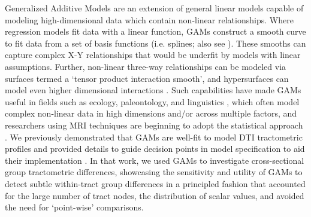 \documentclass[12pt]{article}
\begin{document}
Generalized Additive Models \parencite[GAMs;][]{wood2017GeneralizedAdditiveModels,pedersen2019HierarchicalGeneralizedAdditive,stasinopoulos2008GeneralizedAdditiveModels} are an extension of general linear models capable of modeling high-dimensional data which contain non-linear relationships. Where regression models fit data with a linear function, GAMs construct a smooth curve to fit data from a set of basis functions (i.e. splines; also see \textcite{verbyla1999AnalysisDesignedExperiments}). These smooths can capture complex X-Y relationships that would be underfit by models with linear assumptions. Further, non-linear three-way relationships can be modeled via surfaces termed a `tensor product interaction smooth', and hypersurfaces can model even higher dimensional interactions \parencite{baayen2020IntroductionGeneralizedAdditive}. Such capabilities have made GAMs useful in fields such as ecology, paleontology, and linguistics \parencite[e.g.][]{simpson2018ModellingPalaeoecologicalTime,pedersen2019HierarchicalGeneralizedAdditive,schmidt2011SpatiallyExplicitHeight,wieling2011QuantitativeSocialDialectology,simpson2018ModellingPalaeoecologicalTime,wieling2018AnalyzingDynamicPhonetic,murase2009ApplicationGeneralizedAdditive,vanrij2019AnalyzingTimeCourse}, which often model complex non-linear data in high dimensions and/or across multiple factors, and researchers using MRI techniques are beginning to adopt the statistical approach \parencite[e.g.][]{lee2025AtypicalMaturationFunctional,xu2025AgeBSASexspecific,wierenga2018UnravelingAgePuberty,mundo2022GeneralizedAdditiveModels,roy2025DevelopmentArcuateFasciculus,sorensen2021MetaanalysisGeneralizedAdditive,caffarra2024DevelopmentAlphaRhythm}. We previously demonstrated that GAMs are well-fit to model DTI tractometric profiles and provided details to guide decision points in model specification to aid their implementation \parencite{muncy2022GeneralAdditiveModels}. In that work, we used GAMs to investigate cross-sectional group tractometric differences, showcasing the sensitivity and utility of GAMs to detect subtle within-tract group differences in a principled fashion that accounted for the large number of tract nodes, the distribution of scalar values, and avoided the need for `point-wise' comparisons.
\end{document}
